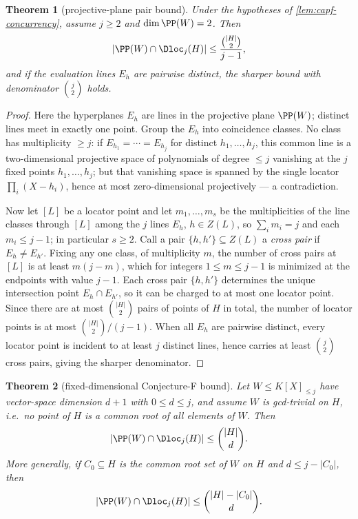 \documentclass[11pt]{article}
\newtheorem{theorem}{Theorem}[section]
\theoremstyle{definition}
\theoremstyle{remark}
\begin{document}
\begin{theorem}[projective-plane pair bound]\label{thm:capf-dim2}
Under the hypotheses of \cref{lem:capf-concurrency}, assume $j\ge2$ and $\dim\PP(W)=2$.  Then
\[
        |\PP(W)\cap\Dloc_j(H)|
        \le
        \frac{\binom{|H|}{2}}{j-1},
\]
and if the evaluation lines $E_h$ are pairwise distinct, the sharper bound with denominator $\binom j2$ holds.
\end{theorem}

\begin{proof}
Here the hyperplanes $E_h$ are lines in the projective plane $\PP(W)$; distinct lines meet in exactly one point.  Group the $E_h$ into coincidence classes.  No class has multiplicity $\ge j$: if $E_{h_1}=\cdots=E_{h_j}$ for distinct $h_1,\ldots,h_j$, this common line is a two-dimensional projective space of polynomials of degree $\le j$ vanishing at the $j$ fixed points $h_1,\ldots,h_j$; but that vanishing space is spanned by the single locator $\prod_i(X-h_i)$, hence at most zero-dimensional projectively --- a contradiction.

Now let $[L]$ be a locator point and let $m_1,\ldots,m_s$ be the multiplicities of the line classes through $[L]$ among the $j$ lines $E_h$, $h\in Z(L)$, so $\sum_i m_i=j$ and each $m_i\le j-1$; in particular $s\ge2$.  Call a pair $\{h,h'\}\subseteq Z(L)$ a \emph{cross pair} if $E_h\ne E_{h'}$.  Fixing any one class, of multiplicity $m$, the number of cross pairs at $[L]$ is at least $m(j-m)$, which for integers $1\le m\le j-1$ is minimized at the endpoints with value $j-1$.  Each cross pair $\{h,h'\}$ determines the unique intersection point $E_h\cap E_{h'}$, so it can be charged to at most one locator point.  Since there are at most $\binom{|H|}2$ pairs of points of $H$ in total, the number of locator points is at most $\binom{|H|}2/(j-1)$.  When all $E_h$ are pairwise distinct, every locator point is incident to at least $j$ distinct lines, hence carries at least $\binom j2$ cross pairs, giving the sharper denominator.
\end{proof}

\begin{theorem}[fixed-dimensional Conjecture-F bound]\label{thm:capf-fixeddim}
Let $W\le K[X]_{\le j}$ have vector-space dimension $d+1$ with $0\le d\le j$, and assume $W$ is gcd-trivial on $H$, i.e.\ no point of $H$ is a common root of all elements of $W$.  Then
\[
        |\PP(W)\cap\Dloc_j(H)|\le \binom{|H|}{d}.
\]
More generally, if $C_0\subseteq H$ is the common root set of $W$ on $H$ and $d\le j-|C_0|$, then
\[
        |\PP(W)\cap\Dloc_j(H)|\le \binom{|H|-|C_0|}{d}.
\]
\end{theorem}
\end{document}
